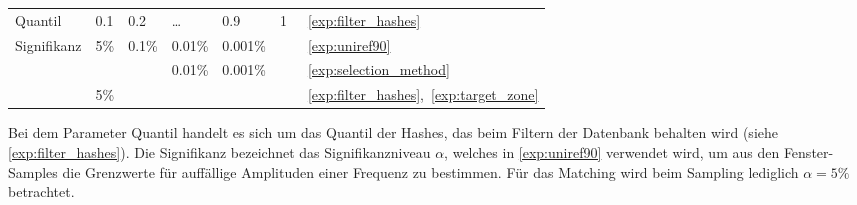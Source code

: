\begin{table}[H]
\begin{tabular}{lllllll}
             Quantil     &0.1 & 0.2   & \dots  & 0.9    & 1         & ~\ref{exp:filter_hashes}\\
             Signifikanz &5\% & 0.1\% & 0.01\% & 0.001\%&           &~\ref{exp:uniref90}\\
                         &    &       & 0.01\% & 0.001\%&           &~\ref{exp:selection_method}\\
                         &5\% &       &        &        &           &~\ref{exp:filter_hashes},~\ref{exp:target_zone}\\
             \bottomrule
            \end{tabular}
        \end{table}

        Bei dem Parameter Quantil handelt es sich um das Quantil der Hashes, das beim Filtern der Datenbank behalten wird (siehe \autoref{exp:filter_hashes}). Die Signifikanz bezeichnet das Signifikanzniveau $\alpha$, welches in \autoref{exp:uniref90} verwendet wird, um aus den Fenster-Samples die Grenzwerte für auffällige Amplituden einer Frequenz zu bestimmen. Für das Matching wird beim Sampling lediglich $\alpha=5\%$ betrachtet.

